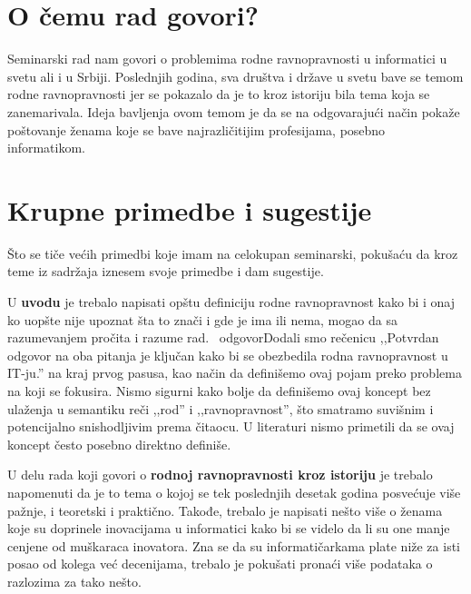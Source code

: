 \documentclass[a4paper]{report}
\begin{document}
\section{O čemu rad govori?}
Seminarski rad nam govori o problemima rodne ravnopravnosti u informatici u svetu ali i u Srbiji. Poslednjih godina, sva društva i države u svetu bave se temom rodne ravnopravnosti jer se pokazalo da je to kroz istoriju bila tema koja se zanemarivala. Ideja bavljenja ovom temom je da se na odgovarajući način pokaže poštovanje ženama koje se bave najrazličitijim profesijama, posebno informatikom.

\section{Krupne primedbe i sugestije}
Što se tiče većih primedbi koje imam na celokupan seminarski, pokušaću da kroz teme iz sadržaja iznesem svoje primedbe i dam sugestije.

U \textbf{uvodu} je trebalo napisati opštu definiciju rodne ravnopravnost kako bi i onaj ko uopšte nije upoznat šta to znači i gde je ima ili nema, mogao da sa razumevanjem pročita i razume rad.
\
odgovor{Dodali smo rečenicu ,,Potvrdan odgovor na oba pitanja je ključan kako bi se obezbedila rodna ravnopravnost u IT-ju.'' na kraj prvog pasusa, kao način da definišemo ovaj pojam preko problema na koji se fokusira. Nismo sigurni kako bolje da definišemo ovaj koncept bez ulaženja u semantiku reči ,,rod'' i ,,ravnopravnost'', što smatramo suvišnim i potencijalno snishodljivim prema čitaocu. U literaturi nismo primetili da se ovaj koncept često posebno direktno definiše.}

U delu rada koji govori o \textbf{rodnoj ravnopravnosti kroz istoriju} je trebalo napomenuti da je to tema o kojoj se tek poslednjih desetak godina posvećuje više pažnje, i teoretski i praktično. Takođe, trebalo je napisati nešto više o ženama koje su doprinele inovacijama u informatici kako bi se videlo da li su one manje cenjene od muškaraca inovatora. Zna se da su informatičarkama plate niže za isti posao od kolega već decenijama, trebalo je pokušati pronaći više podataka o razlozima za tako nešto.
\end{document}
